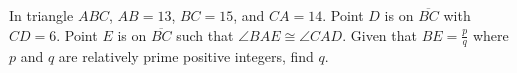 In triangle $ABC$, $AB=13$, $BC=15$, and $CA=14$. Point $D$ is on $\overline{BC}$ with $CD=6.$  Point $E$ is on $\overline{BC}$ such that $\angle BAE\cong \angle CAD.$ Given that $BE=\frac pq$ where $p$ and $q$ are relatively prime positive integers, find $q.$